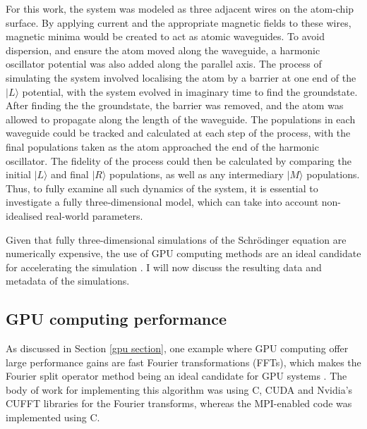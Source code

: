 For this work, the system was modeled as three adjacent wires on the atom-chip surface. By applying current and the appropriate magnetic fields to these wires, magnetic minima would be created to act as atomic waveguides. To avoid dispersion, and ensure the atom moved along the waveguide, a harmonic oscillator potential was also added along the parallel axis. The process of simulating the system involved localising the atom by a barrier at one end of the $|L\rangle$ potential, with the system evolved in imaginary time to find the groundstate. After finding the the groundstate, the barrier was removed, and the atom was allowed to propagate along the length of the waveguide. The populations in each waveguide could be tracked and calculated at each step of the process, with the final populations taken as the atom approached the end of the harmonic oscillator. The fidelity of the process could then be calculated by comparing the initial $| L \rangle$ and final $|R \rangle$ populations, as well as any intermediary $| M \rangle$ populations. Thus, to fully examine all such dynamics of the system, it is essential to investigate a fully three-dimensional model, which can take into account non-idealised real-world parameters.

Given that fully three-dimensional simulations of the Schr\"odinger equation are numerically expensive, the use of GPU computing methods are an ideal candidate for accelerating the simulation \cite{Bauke:11}. I will now discuss the resulting data and metadata of the simulations.





\subsection{GPU computing performance}

As discussed in Section \ref{gpu section}, one example where GPU computing offer large performance gains are fast Fourier transformations (FFTs), which makes the Fourier split operator method being an ideal candidate for GPU systems \cite{Bauke:11}. The body of work for implementing this algorithm was using C, CUDA and Nvidia's CUFFT libraries for the Fourier transforms, whereas the MPI-enabled code was implemented using C.

